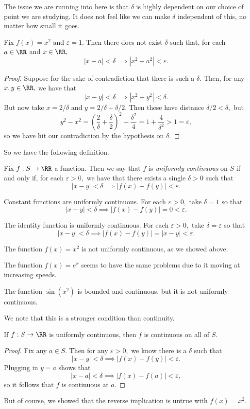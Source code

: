 \documentclass[../notes.tex]{subfiles}
\begin{document}
The issue we are running into here is that $\delta$ is highly dependent on our choice of point we are studying. It does not feel like we can make $\delta$ independent of this, no matter how small it goes.
\begin{proposition}
	Fix $f(x)=x^2$ and $\varepsilon=1.$ Then there does not exist $\delta$ such that, for each $a\in\RR$ and $x\in\RR,$
	\[|x-a|<\delta\implies\left|x^2-a^2\right|<\varepsilon.\]
\end{proposition}
\begin{proof}
	Suppose for the sake of contradiction that there is such a $\delta.$ Then, for any $x,y\in\RR,$ we have that
	\[|x-y|<\delta\implies\left|x^2-y^2\right|<\delta.\]
	But now take $x=2/\delta$ and $y=2/\delta+\delta/2.$ Then these have distance $\delta/2<\delta,$ but
	\[y^2-x^2=\left(\frac2\delta+\frac\delta2\right)^2-\frac{\delta^2}4=1+\frac4{\delta^2}>1=\varepsilon,\]
	so we have hit our contradiction by the hypothesis on $\delta.$
\end{proof}
So we have the following definition.
\begin{definition}
	Fix $f:S\to\RR$ a function. Then we say that $f$ is \textit{uniformly continuous} on $S$ if and only if, for each $\varepsilon>0,$ we have that there exists a single $\delta>0$ such that
	\[|x-y|<\delta\implies|f(x)-f(y)|<\varepsilon.\]
\end{definition}
\begin{example}
	Constant functions are uniformly continuous. For each $\varepsilon>0,$ take $\delta=1$ so that
	\[|x-y|<\delta\implies|f(x)-f(y)|=0<\varepsilon.\]
\end{example}
\begin{example}
	The identity function is uniformly continuous. For each $\varepsilon>0,$ take $\delta=\varepsilon$ so that
	\[|x-y|<\delta\implies|f(x)-f(y)|=|x-y|<\varepsilon.\]
\end{example}
\begin{nex}
	The function $f(x)=x^2$ is not uniformly continuous, as we showed above.
\end{nex}
\begin{example}
	The function $f(x)=e^x$ seems to have the same problems due to it moving at increasing speeds.
\end{example}
\begin{nex}
	The function $\sin\left(x^2\right)$ is bounded and continuous, but it is not uniformly continuous.
\end{nex}
We note that this is a stronger condition than continuity.
\begin{prop}
	If $f:S\to\RR$ is uniformly continuous, then $f$ is continuous on all of $S.$
\end{prop}
\begin{proof}
	Fix any $a\in S.$ Then for any $\varepsilon>0,$ we know there is a $\delta$ such that
	\[|x-y|<\delta\implies|f(x)-f(y)|<\varepsilon.\]
	Plugging in $y=a$ shows that
	\[|x-a|<\delta\implies|f(x)-f(a)|<\varepsilon,\]
	so it follows that $f$ is continuous at $a.$
\end{proof}
But of course, we showed that the reverse implication is untrue with $f(x)=x^2.$
\end{document}
